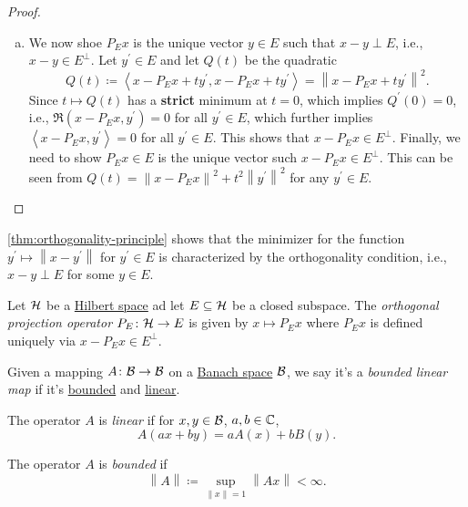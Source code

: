 \begin{proof}
\begin{enumerate}[(a)]
		\item We now shoe \(P_E x\) is the unique vector \(y\in E\) such that \(x - y\perp E\), i.e., \(x-y\in E^\perp\). Let \(y^\prime \in E\) and let \(Q(t)\) be the quadratic
		      \[
			      Q(t)\coloneqq \left\langle x-P_E x + ty^\prime , x - P_E x + ty^\prime  \right\rangle = \left\lVert x - P_E x + ty^\prime \right\rVert ^{2}.
		      \]
		      Since \(t\mapsto Q(t)\) has a \textbf{strict} minimum at \(t = 0\), which implies \(Q^\prime (0) = 0\), i.e., \(\Re \left( x-P_E x, y^\prime  \right) = 0\) for all \(y^\prime \in E\), which further implies \(\left\langle x-P_E x, y^\prime  \right\rangle= 0\) for all \(y^\prime \in E\). This shows that \(x - P_E x\in E^{\perp}\). Finally, we need to show \(P_E x\in E\) is the unique vector such \(x - P_E x\in E^\perp\). This can be seen from \(Q(t)=\left\lVert x - P_E x\right\rVert^{2} + t^{2} \left\lVert y^\prime \right\rVert^{2}\) for any \(y^\prime \in E\).
	\end{enumerate}
\end{proof}

\begin{remark}
	\autoref{thm:orthogonality-principle} shows that the minimizer for the function \(y^\prime \mapsto \left\lVert x - y^\prime \right\rVert \) for \(y^\prime \in E\) is characterized by the orthogonality condition, i.e., \(x - y\perp E\) for some \(y\in E\).
\end{remark}

\begin{definition}\label{def:orthogonal-projection}
	Let \(\mathcal{\MakeUppercase{h}} \) be a \hyperref[def:Hilbert-space]{Hilbert space} ad let \(E\subseteq \mathcal{\MakeUppercase{h}} \) be a closed subspace. The \emph{orthogonal projection operator} \(P_E\colon \mathcal{\MakeUppercase{h}} \to E\) is given by \(x \mapsto P_E x\) where \(P_E x\) is defined uniquely via \(x - P_E x\in E^\perp\).
\end{definition}

\begin{definition}\label{def:bounded-linear-map}
	Given a mapping \(A\colon \mathcal{\MakeUppercase{b}} \to \mathcal{\MakeUppercase{b}} \) on a \hyperref[def:Banach-space]{Banach space} \(\mathcal{\MakeUppercase{b}} \), we say it's a \emph{bounded linear map} if it's \hyperref[def:bounded-map]{bounded} and \hyperref[def:linear-map]{linear}.

	\begin{definition}\label{def:linear-map}
		The operator \(A\) is \emph{linear} if for \(x, y\in \mathcal{\MakeUppercase{b}} \), \(a, b\in \mathbb{\MakeUppercase{c}} \),
		\[
			A(ax + by) = a A(x) + b B(y).
		\]
	\end{definition}

	\begin{definition}\label{def:bounded-map}
		The operator \(A\) is \emph{bounded} if
		\[
			\left\lVert A\right\rVert \coloneqq \sup _{\left\lVert x\right\rVert = 1} \left\lVert Ax\right\rVert < \infty.
		\]
	\end{definition}
\end{definition}

